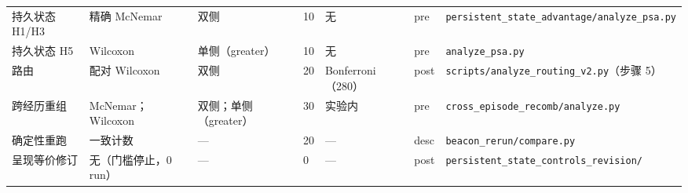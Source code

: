 \documentclass[10pt,a4paper]{ctexart}
\begin{document}
\begin{table}[h]
\begin{tabular}{L{2.3cm}L{2.4cm}L{2.4cm}L{0.7cm}L{1.8cm}L{0.7cm}L{3.5cm}}
持久状态 H1/H3 & 精确 McNemar & 双侧 & 10 & 无 & pre & \texttt{persistent\_state\_\allowbreak advantage/analyze\_psa.py} \\
持久状态 H5 & Wilcoxon & 单侧（greater） & 10 & 无 & pre & \texttt{analyze\_psa.py} \\
路由 & 配对 Wilcoxon & 双侧 & 20 & Bonferroni（280） & post & \texttt{scripts/analyze\_routing\_v2.py}（步骤 5） \\
跨经历重组 & McNemar；Wilcoxon & 双侧；单侧（greater） & 30 & 实验内 & pre & \texttt{cross\_episode\_\allowbreak recomb/analyze.py} \\
确定性重跑 & 一致计数 & --- & 20 & --- & desc & \texttt{beacon\_rerun/compare.py} \\
呈现等价修订 & 无（门槛停止，0 run） & --- & 0 & --- & post & \texttt{persistent\_state\_\allowbreak controls\_\allowbreak revision/} \\
\bottomrule
\end{tabular}
\end{table}
\end{document}
